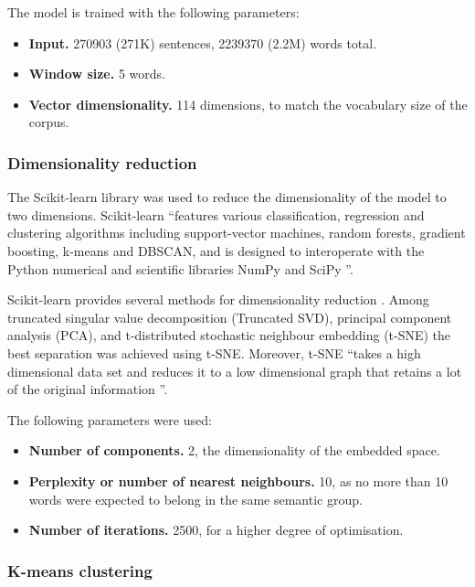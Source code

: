 \documentclass[14pt, a4paper]{extreport}
\begin{document}
The model is trained with the following parameters:

\begin{itemize}
  \item \textbf{Input.} 270903 (271K) sentences, 2239370 (2.2M) words total.
  \item \textbf{Window size.} 5 words.
  \item \textbf{Vector dimensionality.} 114 dimensions, to match the vocabulary size of the corpus.
\end{itemize}
      \subsubsection{Dimensionality reduction}
The Scikit-learn library was used to reduce the dimensionality of the model to two dimensions. Scikit-learn ``features various classification, regression and clustering algorithms including support-vector machines, random forests, gradient boosting, k-means and DBSCAN, and is designed to interoperate with the Python numerical and scientific libraries NumPy and SciPy \parencite{scikit}''.

Scikit-learn provides several methods for dimensionality reduction \parencite{tsne}. Among truncated singular value decomposition (Truncated SVD), principal component analysis (PCA), and t-distributed stochastic neighbour embedding (t-SNE) the best separation was achieved using t-SNE. Moreover, t-SNE ``takes a high dimensional data set and reduces it to a low dimensional graph that retains a lot of the original information \parencite{dimred}''.

The following parameters were used:

\begin{itemize}
  \item \textbf{Number of components.} 2, the dimensionality of the embedded space.
  \item \textbf{Perplexity or number of nearest neighbours.} 10, as no more than 10 words were expected to belong in the same semantic group.
  \item \textbf{Number of iterations.} 2500, for a higher degree of optimisation.
\end{itemize}
      \subsubsection{K-means clustering}
\end{document}
